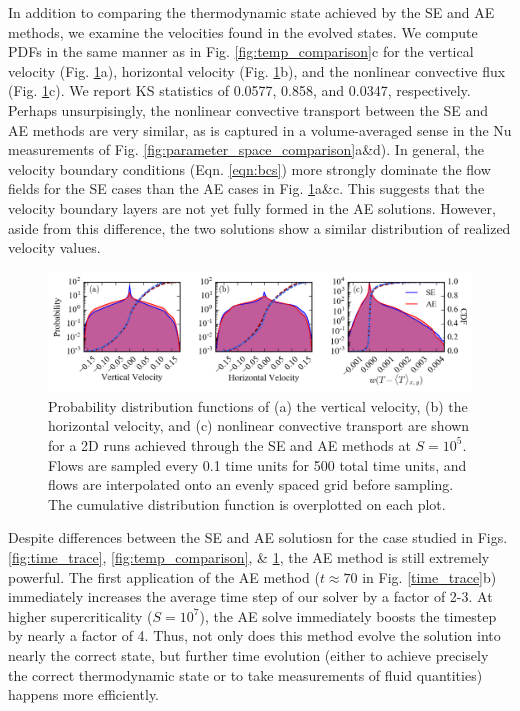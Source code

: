 \documentclass[aps, pre, onecolumn, nofootinbib, notitlepage, groupedaddress, amsfonts, amssymb, amsmath, longbibliography]{revtex4-1}
\begin{document}
In addition to comparing the thermodynamic state achieved by the SE and AE methods,
we examine the velocities found in the evolved states.
We compute PDFs in the same manner as in Fig. \ref{fig:temp_comparison}c for the
vertical velocity (Fig. \ref{fig:pdf_comparison}a), horizontal velocity (Fig. \ref{fig:pdf_comparison}b),
and the nonlinear convective flux (Fig. \ref{fig:pdf_comparison}c). We report KS statistics
of 0.0577, 0.858, and 0.0347, respectively.  Perhaps unsurpisingly, the nonlinear
convective transport between the SE and AE methods are very similar, as is captured
in a volume-averaged sense in the Nu measurements of Fig. \ref{fig:parameter_space_comparison}a\&d).
In general, the velocity boundary conditions (Eqn. \ref{eqn:bcs}) more strongly dominate the flow
fields for the SE cases than the AE cases in Fig. \ref{fig:pdf_comparison}a\&c. 
This suggests that the velocity boundary layers are not yet fully formed in the
AE solutions. However, aside from this difference, the two solutions show a similar
distribution of realized velocity values.

\begin{figure}[b]
\includegraphics[width=\textwidth]{./figs/pdf_comparison.png}
\caption{Probability distribution functions of (a) the vertical velocity, (b) the horizontal velocity, and (c) nonlinear
convective transport are shown for a 2D runs achieved through the SE and AE methods
at $S = 10^{5}$.  Flows are sampled every 0.1 time units for 500 total time units,
and flows are interpolated onto an evenly spaced grid before sampling.
The cumulative distribution function is overplotted on each plot. 
\label{fig:pdf_comparison} }
\end{figure}


Despite differences between the SE and AE solutiosn for the case studied in 
Figs. \ref{fig:time_trace}, \ref{fig:temp_comparison}, \& \ref{fig:pdf_comparison},
the AE method is still extremely powerful.  The first application of the AE method
($t \approx 70$ in Fig. \ref{time_trace}b) immediately increases the 
average time step of our solver by a factor of 2-3. At higher supercriticality
($S = 10^7$), the AE solve immediately boosts the timestep by nearly a factor of 4.
Thus, not only does this method evolve the solution into nearly the correct state, 
but further time evolution (either to achieve precisely the correct thermodynamic
state or to take measurements of fluid quantities) happens more efficiently.
\end{document}

